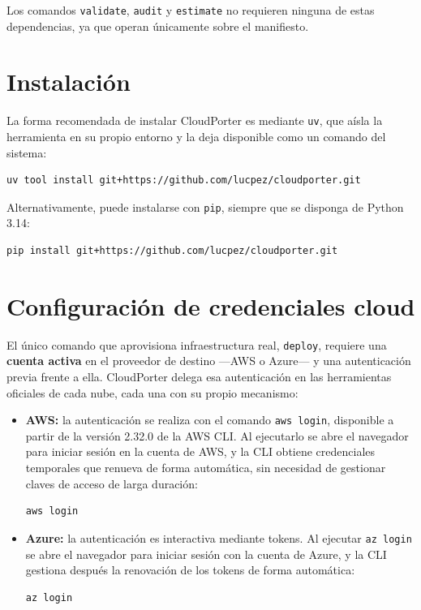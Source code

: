 Los comandos \texttt{validate}, \texttt{audit} y \texttt{estimate} no requieren ninguna de estas
dependencias, ya que operan únicamente sobre el manifiesto.

\section*{Instalación}

La forma recomendada de instalar CloudPorter es mediante \texttt{uv}, que aísla la herramienta en
su propio entorno y la deja disponible como un comando del sistema:

\begin{lstlisting}
uv tool install git+https://github.com/lucpez/cloudporter.git
\end{lstlisting}

Alternativamente, puede instalarse con \texttt{pip}, siempre que se disponga de Python 3.14:

\begin{lstlisting}
pip install git+https://github.com/lucpez/cloudporter.git
\end{lstlisting}

\section*{Configuración de credenciales cloud}

El único comando que aprovisiona infraestructura real, \texttt{deploy}, requiere una
\textbf{cuenta activa} en el proveedor de destino —AWS o Azure— y una autenticación previa frente
a ella. CloudPorter delega esa autenticación en las herramientas oficiales de cada nube, cada una
con su propio mecanismo:

\begin{itemize}
    \item \textbf{AWS:} la autenticación se realiza con el comando \texttt{aws login}, disponible a
    partir de la versión 2.32.0 de la AWS CLI. Al ejecutarlo se abre el navegador para iniciar
    sesión en la cuenta de AWS, y la CLI obtiene credenciales temporales que renueva de forma
    automática, sin necesidad de gestionar claves de acceso de larga duración:

\begin{lstlisting}
aws login
\end{lstlisting}

    \item \textbf{Azure:} la autenticación es interactiva mediante tokens. Al ejecutar
    \texttt{az login} se abre el navegador para iniciar sesión con la cuenta de Azure, y la CLI
    gestiona después la renovación de los tokens de forma automática:

\begin{lstlisting}
az login
\end{lstlisting}
\end{itemize}

